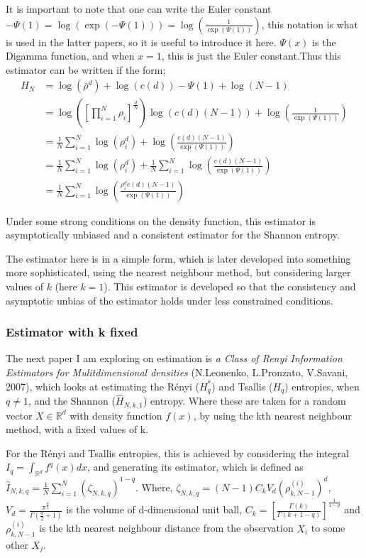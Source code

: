 \documentclass{article}
\begin{document}
It is important to note that one can write the Euler constant $-\Psi(1) = \log (\exp(-\Psi(1))) = \log (\frac{1}{\exp(\Psi(1))})$, this notation is what is used in the latter papers, so it is useful to introduce it here. $\Psi(x)$ is the Digamma function, and when $x=1$, this is just the Euler constant.Thus this estimator can be written if the form;
\begin{align}
H_{N} &= \log(\bar{\rho}^{d} ) + \log (c(d)) - \Psi(1)  + \log (N-1) \nonumber \\
&= \log \left( \left[ \prod_{i=1}^{N} \rho_{i} \right]^{\frac{d}{N}} \right) \log( c(d) (N-1)) + \log \left(\frac{1}{\exp(\Psi(1))}\right) \nonumber \\
&= \frac{1}{N} \sum_{i=1}^{N} \log( \rho_{i}^{d} ) + \log \left( \frac{c(d) (N-1)}{ \exp(\Psi(1))} \right) \nonumber \\
&= \frac{1}{N} \sum_{i=1}^{N}\log(\rho_{i}^{d}) + \frac{1}{N} \sum_{i=1}^{N} \log \left( \frac{c(d) (N-1)}{\exp(\Psi(1))}\right) \nonumber \\
&= \frac{1}{N} \sum_{i=1}^{N} \log \left( \frac{\rho_{i}^{d} c(d) (N-1)}{\exp(\Psi(1))}\right) \label{Est_k=1}
\end{align}

Under some strong conditions on the density function, this estimator is asymptotically unbiased and a consistent estimator for the Shannon entropy. 

The estimator here is in a simple form, which is later developed into something more sophisticated, using the nearest neighbour method, but considering larger values of $k$ (here $k=1$). This estimator is developed so that the consistency and asymptotic unbias of the estimator holds under less constrained conditions.


\subsubsection{Estimator with k fixed}

The next paper I am exploring on estimation is \textit{a Class of Renyi Information Estimators for Mulitdimensional densities} (N.Leonenko, L.Pronzato, V.Savani, 2007), which looks at estimating the R\'enyi ($H_{q}^{*}$) and Tsallis ($H_{q}$) entropies, when $q \neq 1$, and the Shannon ($\hat{H}_{N, k, 1}$) entropy. Where these are taken for a random vector $X \in \mathbb{R}^d$ with density function $f(x)$, by using the kth nearest neighbour method, with a fixed values of k. 

For the R\'enyi and Tsallis entropies, this is achieved by considering the integral  $I_{q} = \int_{\mathbb{R}^d} f^q (x) dx$, and generating its estimator, which is defined as $\hat{I}_{N, k, q} = \frac{1}{N} \sum_{i=1}^{N} (\zeta_{N, k, q})^{1-q}$. Where, $\zeta_{N, k ,q} = (N-1)C_{k}V_{d}(\rho_{k, N-1}^{(i)})^d$,  $V_{d} = \frac{\pi^{\frac{d}{2}}}{\Gamma(\frac{d}{2} + 1 )}$ is the volume of d-dimensional unit ball, $C_{k} = \left[ \frac{\Gamma(k)}{\Gamma(k+1-q)} \right]^{\frac{1}{1-q}}$ and $\rho_{k, N-1}^{(i)}$ is the kth nearest neighbour distance from the observation $X_{i}$ to some other $X_{j}$.
\end{document}
